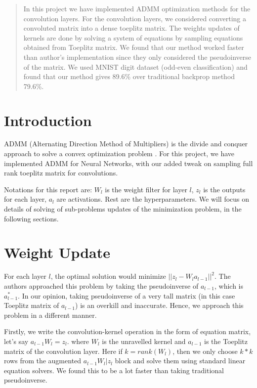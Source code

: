 \documentclass[12pt]{article}
\begin{document}
\maketitle

\begin{abstract}
In this project we have implemented ADMM optimization methods for the convolution layers.
For the convolution layers, we considered converting a convoluted matrix into a dense toeplitz matrix.
The weights updates of kernels are done by solving a system of equations by sampling equations obtained from Toeplitz matrix.
We found that our method worked faster than author's implementation since they only considered the pseudoinverse of the matrix.
We used MNIST digit dataset (odd-even classification) and found that our method gives 89.6\% over traditional backprop method 79.6\%.
\end{abstract}

\section{Introduction}
ADMM (Alternating Direction Method of Multipliers) is the divide and conquer approach to solve a convex optimization problem \cite{taylor2016training}.
For this project, we have implemented ADMM for Neural Networks, with our added tweak on sampling full rank toeplitz matrix for convolutions.

Notations for this report are: $W_l$ is the weight filter for layer $l$, $z_l$ is the outputs for each layer, $a_l$ are activations.
Rest are the hyperparameters.
We will focus on details of solving of sub-problems updates of the minimization problem, in the following sections.

\section{Weight Update}

For each layer $l$, the optimal solution would minimize $||z_l - W_l a_{l-1} ||^2$.
The authors approached this problem by taking the pseudoinverse of $a_{l-1}$, which is $a_{l-1}^*$.
In our opinion, taking pseudoinverse of a very tall matrix (in this case Toeplitz matrix \cite{gray2006toeplitz} of $a_{l-1}$) is an overkill and inaccurate.
Hence, we approach this problem in a different manner.

Firstly, we write the convolution-kernel operation in the form of equation matrix, let's say $a_{l-1}W_l  = z_l$.
where $W_l$ is the unravelled kernel and $a_{l-1}$ is the Toeplitz matrix of the convolution layer.
Here if $k = rank(W_l)$, then we only choose $k*k$ rows from the augmented $a_{l-1}W_l | z_l$ block and solve them using standard linear equation solvers.
We found this to be a lot faster than taking traditional pseudoinverse.
\end{document}
